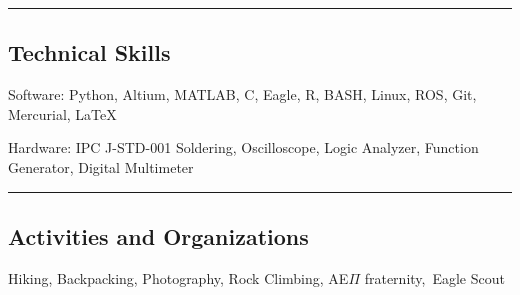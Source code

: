 \documentclass[10pt,letterpaper]{article}
\newenvironment{indentsection}[1]%
{\begin{list}{}%
	{\setlength{\leftmargin}{#1}}%
	\item[]%
}
{\end{list}}
\begin{document}
\hrule
\vspace{-0.4em}
\subsection*{Technical Skills}

\begin{description*}
	\item[Software:]
	 Python, Altium, MATLAB, C, Eagle, R, BASH, Linux, ROS, Git, Mercurial, \LaTeX
	\item[Hardware:]
	IPC J-STD-001 Soldering, Oscilloscope, Logic Analyzer, Function Generator, Digital Multimeter
\end{description*}

\hrule
\vspace{-0.4em}
\subsection*{Activities and Organizations}
\indent Hiking, Backpacking, Photography, Rock Climbing, AE$\Pi$ fraternity,\, Eagle Scout
\end{document}
